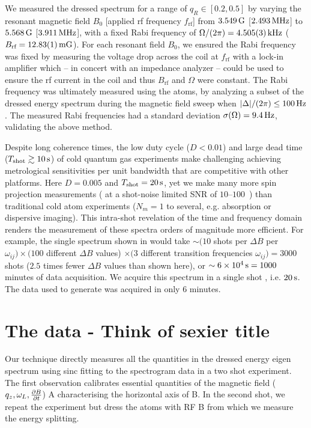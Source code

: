 \documentclass[aps,prl,reprint,superscriptaddress,floatfix]{revtex4-1}
\begin{document}
We measured the dressed spectrum for a range of $q_R \in [0.2, 0.5]$ by varying the resonant magnetic field $B_0$ [applied rf frequency $f_{\text{rf}}$] from $\unit[3.549]{G}$ [$\unit[2.493]{MHz}$] to $\unit[5.568]{G}$ [$\unit[3.911]{MHz}$], with a fixed Rabi frequency of $\Omega/(2\pi) = \unit[4.505(3)]{kHz}$ ($B_{\text{rf}} = \unit[12.83(1)]{mG}$).
For each resonant field $B_0$, we ensured the Rabi frequency was fixed by measuring the voltage drop across the coil at $f_{\text{rf}}$ with a lock-in amplifier which -- in concert with an impedance analyzer -- could be used to ensure the rf current in the coil and thus $B_{\text{rf}}$ and $\Omega$ were constant. 
The Rabi frequency was ultimately measured using the atoms, by analyzing a subset of the dressed energy spectrum during the magnetic field sweep when $\abs{\Delta}/(2\pi) \leq \unit[100]{Hz}$.
The measured Rabi frequencies had a standard deviation $\sigma(\Omega) = \unit[9.4]{Hz}$, validating the above method.

    Despite long coherence times, the low duty cycle ($D < 0.01$) and large dead time ($T_\text{shot} \gtrsim \unit[10]{s}$) of cold quantum gas experiments make challenging achieving metrological sensitivities per unit bandwidth that are competitive with other platforms.
Here $D=0.005$ and $T_\text{shot} = \unit[20]{s}$, yet we make many more spin projection measurements ( at a shot-noise limited SNR of $10$--$100$~\cite{jasperse_magic-wavelength_2017}) than traditional cold atom experiments ($N_m = 1$ to several, e.g. absorption or dispersive imaging).
This intra-shot revelation of the time and frequency domain renders the measurement of these spectra orders of magnitude more efficient.
For example, the single spectrum shown in  would take $\sim (10$ shots per $\Delta B$ per $\omega_{ij} ) \times (100$ different $\Delta B$ values) $\times (3 $ different transition frequencies $\omega_{ij}) = 3000$ shots ($2.5$ times fewer $\Delta B$ values than shown here), or $\sim \unit[6\times10^4]{s} = 1000$ minutes of data acquisition.
We acquire this spectrum in a single shot , i.e. $\unit[20]{s}$.
The data used to generate  was acquired in only $6$ minutes.
  

\section{The data - Think of sexier title}
\label{sec:data}
Our technique directly measures all the quantities in the dressed energy eigen spectrum using sinc fitting to the spectrogram data in a two shot experiment. 
The first observation calibrates essential quantities of the magnetic field ($q_{z}, \omega_{L}, \frac{\partial B}{\partial t} $) A characterising the horizontal axis of B. In the second shot, we repeat the experiment but dress the atoms with RF B from which we measure the energy splitting. 



   
\end{document}
